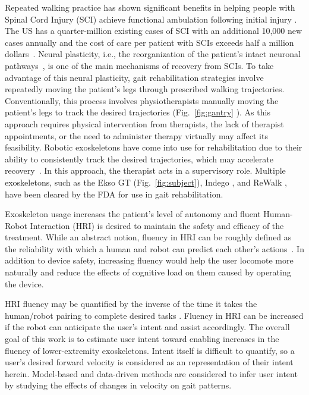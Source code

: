Repeated walking practice has shown significant benefits in helping people with Spinal Cord Injury (SCI) achieve functional ambulation following initial injury \cite{lam2007systematic}. The US has a quarter-million existing cases of SCI with an additional 10,000 new cases annually \cite{nih} and the cost of care per patient with SCIs exceeds half a million dollars~\cite{devivo2011costs}. Neural plasticity, i.e., the reorganization of the patient's intact neuronal pathways~\cite{curt2008recovery}, is one of the main mechanisms of recovery from SCIs. To take advantage of this neural plasticity, gait rehabilitation strategies involve repeatedly moving the patient's legs through prescribed walking trajectories. Conventionally, this process involves physiotherapists manually moving the patient's legs to track the desired trajectories (Fig.~\ref{fig:gantry} \cite{gaitrehabgantry}). %
As this approach requires physical intervention from therapists, the lack of therapist appointments, or the need to administer therapy virtually may affect its feasibility. Robotic exoskeletons have come into use for rehabilitation due to their ability to consistently track the desired trajectories, which may accelerate recovery~\cite{hidler2011role}. In this approach, the therapist acts in a supervisory role. Multiple exoskeletons, such as the Ekso GT \cite{brenner2016exploring} (Fig.~\ref{fig:subject}), Indego \cite{sup2008design}, and ReWalk \cite{rewalk}, have been cleared by the FDA for use in gait rehabilitation.

Exoskeleton usage increases the patient's level of autonomy and fluent Human-Robot Interaction (HRI) is desired to maintain the safety and efficacy of the treatment. While an abstract notion, fluency in HRI can be roughly defined as the reliability with which a human and robot can predict each other's actions~\cite{hoffman2007cost}. In addition to device safety, increasing fluency would help the user locomote more naturally and reduce the effects of cognitive load \cite{bogen2018walk} on them caused by operating the device.

HRI fluency may be quantified by the inverse of the time it takes the human/robot pairing to complete desired tasks \cite{hoffman2019evaluating}. Fluency in HRI can be increased if the robot can anticipate the user's intent and assist accordingly. The overall goal of this work is to estimate user intent toward enabling increases in the fluency of lower-extremity exoskeletons. Intent itself is difficult to quantify, so a user's desired forward velocity is considered as an representation of their intent herein. Model-based and data-driven methods are considered to infer user intent by studying the effects of changes in velocity on gait patterns.

